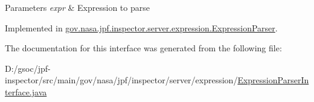 \begin{DoxyParams}{Parameters}
{\em expr} & Expression to parse \\
\hline
\end{DoxyParams}


Implemented in \hyperlink{classgov_1_1nasa_1_1jpf_1_1inspector_1_1server_1_1expression_1_1_expression_parser_a0b6378f9bb019b8ba7a226af19a6f6e8}{gov.\+nasa.\+jpf.\+inspector.\+server.\+expression.\+Expression\+Parser}.



The documentation for this interface was generated from the following file\+:\begin{DoxyCompactItemize}
\item 
D\+:/gsoc/jpf-\/inspector/src/main/gov/nasa/jpf/inspector/server/expression/\hyperlink{_expression_parser_interface_8java}{Expression\+Parser\+Interface.\+java}\end{DoxyCompactItemize}
